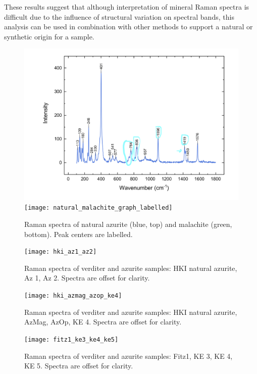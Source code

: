 These results suggest that although interpretation of mineral Raman spectra is difficult due to the influence of structural variation on spectral bands, this analysis can be used in combination with other methods to support a natural or synthetic origin for a sample. 

\begin{figure}[H]
\centering
\begin{minipage}[t]{\linewidth}
  \centering
  \includegraphics[width=0.9\linewidth]{az1_blue_withlabels}
\hfill
\texttt{[image: natural\_malachite\_graph\_labelled]}
\hfill
\end{minipage}
\caption[Raman spectra of natural azurite and malachite, peak centers labelled.]{Raman spectra of natural azurite (blue, top) and malachite (green, bottom). Peak centers are labelled.}
\label{fig:label_raman}
\end{figure}

\begin{figure}[H]
\centering
  \texttt{[image: hki\_az1\_az2]}
\caption[Raman spectra of blue samples.]{Raman spectra of verditer and azurite samples: HKI natural azurite, Az 1, Az 2. Spectra are offset for clarity.}
\label{fig:blue_comparison1}
\end{figure}

\begin{figure}[H]
  \centering
  \texttt{[image: hki\_azmag\_azop\_ke4]}
\caption[Raman spectra of blue samples.]{Raman spectra of verditer and azurite samples: HKI natural azurite, AzMag, AzOp, KE 4. Spectra are offset for clarity.}
\label{fig:blue_comparison2}
\end{figure}

\begin{figure}[H]
  \centering
  \texttt{[image: fitz1\_ke3\_ke4\_ke5]}
\caption[Raman spectra of blue samples.]{Raman spectra of verditer and azurite samples: Fitz1, KE 3, KE 4, KE 5. Spectra are offset for clarity.}
\label{fig:blue_comparison3}
\end{figure}

